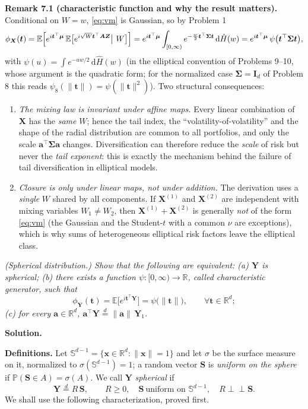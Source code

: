\documentclass{MFM-hw} %
\newcommand{\real}{\mathbb{R}}
\newcommand{\dd}{\,\mathrm{d}}
\newcommand{\E}{\mathbb{E}}
\renewcommand{\P}{\mathbb{P}}
\newcommand{\inde}{\perp\!\!\!\perp}
\newcommand{\bX}{\bm{X}}
\newcommand{\bY}{\bm{Y}}
\newcommand{\bZ}{\bm{Z}}
\newcommand{\bA}{\bm{A}}
\newcommand{\bI}{\bm{I}}
\newcommand{\bS}{\bm{S}}
\newcommand{\bx}{\bm{x}}
\newcommand{\bt}{\bm{t}}
\newcommand{\ba}{\bm{a}}
\newcommand{\bmu}{\bm{\mu}}
\newcommand{\bSigma}{\bm{\Sigma}}
\begin{document}
\smallskip
\noindent\textbf{Remark 7.1 (characteristic function and why the result matters).} Conditional on $W=w$, \eqref{eq:vm} is Gaussian, so by Problem 1
\[
    \phi_{\bX}(\bt)=\E\Bigl[e^{i\bt^\top\bmu}\,\E\bigl[e^{i\sqrt{W}\bt^\top\bA\bZ}\big|\ W\bigr]\Bigr]
    =e^{i\bt^\top\bmu}\int_{[0,\infty)}e^{-\frac{w}{2}\bt^\top\bSigma\bt}\dd\hat H(w)
    =e^{i\bt^\top\bmu}\,\psi\bigl(\bt^\top\bSigma\bt\bigr),
\]
with $\psi(u)=\int e^{-uw/2}\dd\hat H(w)$ (in the elliptical convention of Problems 9--10, whose argument is the quadratic form; for the normalized case $\bSigma=\bI_d$ of Problem 8 this reads $\psi_8(\|\bt\|)=\psi(\|\bt\|^2)$). Two structural consequences:
\begin{enumerate}
    \item \emph{The mixing law is invariant under affine maps.} Every linear combination of $\bX$ has the \emph{same} $W$; hence the tail index, the ``volatility-of-volatility'' and the shape of the radial distribution are common to all portfolios, and only the scale $\ba^\top\bSigma\ba$ changes. Diversification can therefore reduce the \emph{scale} of risk but never the \emph{tail exponent}: this is exactly the mechanism behind the failure of tail diversification in elliptical models.
    \item \emph{Closure is only under linear maps, not under addition.} The derivation uses a \emph{single} $W$ shared by all components. If $\bX^{(1)}$ and $\bX^{(2)}$ are independent with mixing variables $W_1\ne W_2$, then $\bX^{(1)}+\bX^{(2)}$ is generally \emph{not} of the form \eqref{eq:vm} (the Gaussian and the Student-$t$ with a common $\nu$ are exceptions), which is why sums of heterogeneous elliptical risk factors leave the elliptical class.
\end{enumerate}

\HWproblem
\noindent\textit{(Spherical distribution.) Show that the following are equivalent: (a) $\bY$ is spherical; (b) there exists a function $\psi:[0,\infty)\to\real$, called characteristic generator, such that}
\[
    \phi_{\bY}(\bt)=\E\bigl[e^{i\bt^\top\bY}\bigr]=\psi\bigl(\|\bt\|\bigr),\qquad\forall\bt\in\real^d ;
\]
\textit{(c) for every $\ba\in\real^d$, $\ba^\top\bY\overset{d}{=}\|\ba\|\,\bY_1$.}

\medskip
\noindent\textbf{Solution.}

\smallskip
\noindent\textbf{Definitions.} Let $\mathbb{S}^{d-1}=\{\bx\in\real^d:\|\bx\|=1\}$ and let $\sigma$ be the surface measure on it, normalized to $\sigma(\mathbb{S}^{d-1})=1$; a random vector $\bS$ is \emph{uniform on the sphere} if $\P(\bS\in A)=\sigma(A)$. We call $\bY$ \emph{spherical} if
\begin{equation}\label{eq:sphdef}
    \bY\overset{d}{=}R\,\bS,\qquad R\ge0,\quad \bS\ \text{uniform on }\mathbb{S}^{d-1},\quad R\inde\bS .
\end{equation}
We shall use the following characterization, proved first.
\end{document}
